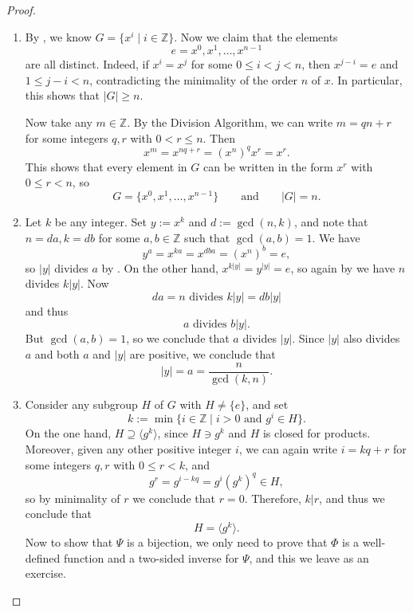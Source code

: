 \documentclass[12pt]{report}
\numberwithin{equation}{section}
\numberwithin{theorem}{chapter}
\theoremstyle{definition}
\newtheorem*{basic properties}{Basic Properties}
\newtheorem*{Important Remark}{Important Remark}
\begin{document}
\begin{proof}
\begin{enumerate}[label=(\alph*)]
\item By , we know $G=\{x^i \mid i \in \mathbb{Z}\}$. Now we claim that the elements 
$$e = x^0, x^1, \dots, x^{n-1}$$ 
are all distinct. Indeed, if $x^i=x^j$ for some $0\leqslant i<j<n$, then $x^{j-i}=e$ and $1 \leqslant j-i<n$, contradicting the minimality of the order $n$ of $x$. In particular, this shows that $|G| \geqslant n$.

Now take any $m \in \mathbb{Z}$. By the Division Algorithm, we can write $m = qn+r$ for some integers $q, r$ with $0 < r \leqslant n$. Then 
$$x^m=x^{nq+r}=(x^n)^qx^r=x^r.$$
This shows that every element in $G$ can be written in the form $x^r$ with $0 \leqslant r < n$, so
$$G = \{x^0, x^1, \dots, x^{n-1}\} \qquad \textrm{and} \qquad |G| = n.$$

\item Let $k$ be any integer. Set $y := x^k$ and $d := \gcd(n,k)$, and note that $n=da, k=db$ for some $a,b\in \mathbb{Z}$ such that $\gcd(a,b)=1$. 
We have
$$y^a=x^{ka}=x^{dba}=(x^n)^b=e,$$ 
so $|y|$ divides $a$ by . On the other hand, $x^{k|y|}=y^{|y|}=e$, so again by  we have $n$ divides $k|y|$. 
Now
$$da = n \textrm{ divides } k|y| = db|y|$$
and thus
$$a \textrm{ divides } b|y|.$$
But $\gcd(a,b)=1$, so we conclude that $a$ divides $|y|$.
Since $|y|$ also divides $a$ and both $a$ and $|y|$ are positive, we conclude that 
$$|y|=a=\frac{n}{\gcd(k,n)}.$$


\item Consider any subgroup $H$ of $G$ with $H \neq \{ e \}$, and set 
$$k := \min \{i \in \mathbb{Z} \mid i>0 \textrm{ and } g^i\in H\}.$$ 
On the one hand, $H \supseteq \langle g^k \rangle$, since $H \ni g^k$ and $H$ is closed for products. Moreover, given any other positive integer $i$, we can again write $i = kq+r$ for some integers $q, r$ with $0 \leqslant r < k$, and
$$g^r = g^{i-kq} = g^i (g^k)^q \in H,$$
so by minimality of $r$ we conclude that $r = 0$. Therefore, $k | r$, and thus we conclude that
$$H = \langle g^k \rangle.$$
Now to show that $\Psi$ is a bijection, we only need to prove that $\Phi$ is a well-defined function and a two-sided inverse for $\Psi$, and this we leave as an exercise.\qedhere
\end{enumerate}
\end{proof}
\end{document}
